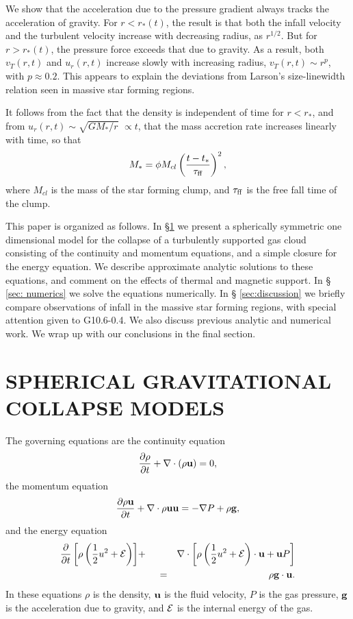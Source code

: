 \documentclass[iop,apj,numberedappendix]{emulateapj}
\newcommand       \phil[1]      {{\color{blue} #1}}
\newcommand       \be		{\begin{equation}}
\newcommand       \ee		{\end{equation}}
\newcommand       \bea          {\begin{eqnarray}}
\newcommand       \eea          {\end{eqnarray}}
\newcommand       \tff          {\tau_{\rm ff}}
\begin{document}
We show that the acceleration due to the pressure gradient always
tracks the acceleration of gravity. For $r<r_*(t)$, the result is that
both the infall velocity and the turbulent velocity increase with
decreasing radius, as $r^{1/2}$. But for $r>r_*(t)$, the pressure
force exceeds that due to gravity. As a result, both $v_T(r,t)$ and
$u_r(r,t)$ increase slowly with increasing radius, $v_T(r,t)\sim r^p$,
with $p\approx 0.2$. This appears to explain the deviations from
Larson's size-linewidth relation seen in massive star forming regions.

It follows from the fact that the density is independent of time for
$r<r_*$, and from $u_r(r,t)\sim\sqrt{GM_*/r}$\phil{$\propto t$}, that the mass accretion
rate increases linearly with time, so that
%
\be  %
M_*=\phi M_{cl}\left({t-t_*\over \tff}\right)^2,
\ee  %
%
where $M_{cl}$ is the mass of the star forming clump, and $\tff$ is
the free fall time of the clump.

This paper is organized as follows.  In \S \ref{sec: collapse} we
present a spherically symmetric one dimensional model for the collapse
of a turbulently supported gas cloud consisting of the continuity and
momentum equations, and a simple closure for the energy equation. We
describe approximate analytic solutions to these equations, and
comment on the effects of thermal and magnetic support.  In \S
\ref{sec: numerics} we solve the equations numerically. In \S
\ref{sec:discussion} we briefly compare observations of infall in the
massive star forming regions, with special attention given to
G10.6-0.4. We also discuss previous analytic and numerical work.  We
wrap up with our conclusions in the final section.

\section{SPHERICAL GRAVITATIONAL COLLAPSE MODELS}
\label{sec: collapse}
The governing equations are the continuity equation
%
\be  %
{\partial\rho\over\partial t}+{\bf \nabla}\cdot (\rho{\bf u}) =0,
\ee  %
%
the momentum equation
%
\be  %
{\partial \rho{\bf u}\over \partial t}+ \nabla\cdot \rho{\bf u u}
= -{\bf \nabla} P + \rho{\bf g},
\ee  %
%
and the energy equation
%
\bea \label{eqn: energy} %
{\partial\over \partial t}\left[\rho\left({1\over2}u^2
+ {\cal E}\right) \right]
&+& \nabla\cdot\left[
\rho\left(
{1\over2}u^2 + {\cal E}
\right)\cdot {\bf u}
+ {\bf u}P \right]\nonumber\\
&\qquad=& \rho {\bf g}\cdot{\bf u}.
\eea  %
%
In these equations $\rho$ is the density, ${\bf u}$ is the fluid
velocity, $P$ is the gas pressure, ${\bf g}$ is the acceleration due
to gravity, and ${\cal E}$ is the internal energy of the gas.
\end{document}
